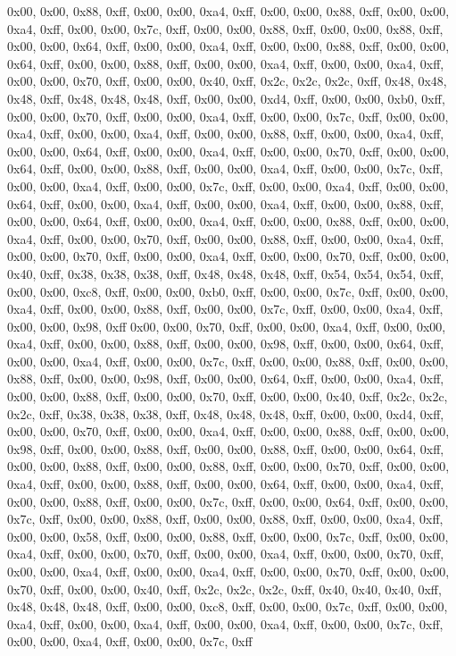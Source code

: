 0x00, 0x00, 0x88, 0xff, 0x00, 0x00, 0xa4, 0xff, 0x00, 0x00, 0x88, 0xff, 0x00, 0x00, 0xa4, 0xff, 0x00, 0x00, 0x7c, 0xff, 0x00, 0x00, 0x88, 0xff, 0x00, 0x00, 0x88, 0xff, 0x00, 0x00, 0x64, 0xff, 0x00, 0x00, 0xa4, 0xff, 0x00, 0x00, 0x88, 0xff, 0x00, 0x00, 0x64, 0xff, 0x00, 0x00, 0x88, 0xff, 0x00, 0x00, 0xa4, 0xff, 0x00, 0x00, 0xa4, 0xff, 0x00, 0x00, 0x70, 0xff, 0x00, 0x00, 0x40, 0xff, 0x2c, 0x2c, 0x2c, 0xff, 0x48, 0x48, 0x48, 0xff, 0x48, 0x48, 0x48, 0xff, 0x00, 0x00, 0xd4, 0xff, 0x00, 0x00, 0xb0, 0xff, 0x00, 0x00, 0x70, 0xff, 0x00, 0x00, 0xa4, 0xff, 0x00, 0x00, 0x7c, 0xff, 0x00, 0x00, 0xa4, 0xff, 0x00, 0x00, 0xa4, 0xff, 0x00, 0x00, 0x88, 0xff, 0x00, 0x00, 0xa4, 0xff, 0x00, 0x00, 0x64, 0xff, 0x00, 0x00, 0xa4, 0xff, 0x00, 0x00, 0x70, 0xff, 0x00, 0x00, 0x64, 0xff, 0x00, 0x00, 0x88, 0xff, 0x00, 0x00, 0xa4, 0xff, 0x00, 0x00, 0x7c, 0xff, 0x00, 0x00, 0xa4, 0xff, 0x00, 0x00, 0x7c, 0xff, 0x00, 0x00, 0xa4, 0xff, 0x00, 0x00, 0x64, 0xff, 0x00, 0x00, 0xa4, 0xff, 0x00, 0x00, 0xa4, 0xff, 0x00, 0x00, 0x88, 0xff, 0x00, 0x00, 0x64, 0xff, 0x00, 0x00, 0xa4, 0xff, 0x00, 0x00, 0x88, 0xff, 0x00, 0x00, 0xa4, 0xff, 0x00, 0x00, 0x70, 0xff, 0x00, 0x00, 0x88, 0xff, 0x00, 0x00, 0xa4, 0xff, 0x00, 0x00, 0x70, 0xff, 0x00, 0x00, 0xa4, 0xff, 0x00, 0x00, 0x70, 0xff, 0x00, 0x00, 0x40, 0xff, 0x38, 0x38, 0x38, 0xff, 0x48, 0x48, 0x48, 0xff, 0x54, 0x54, 0x54, 0xff, 0x00, 0x00, 0xc8, 0xff, 0x00, 0x00, 0xb0, 0xff, 0x00, 0x00, 0x7c, 0xff, 0x00, 0x00, 0xa4, 0xff, 0x00, 0x00, 0x88, 0xff, 0x00, 0x00, 0x7c, 0xff, 0x00, 0x00, 0xa4, 0xff, 0x00, 0x00, 0x98, 0xff
0x00, 0x00, 0x70, 0xff, 0x00, 0x00, 0xa4, 0xff, 0x00, 0x00, 0xa4, 0xff, 0x00, 0x00, 0x88, 0xff, 0x00, 0x00, 0x98, 0xff, 0x00, 0x00, 0x64, 0xff, 0x00, 0x00, 0xa4, 0xff, 0x00, 0x00, 0x7c, 0xff, 0x00, 0x00, 0x88, 0xff, 0x00, 0x00, 0x88, 0xff, 0x00, 0x00, 0x98, 0xff, 0x00, 0x00, 0x64, 0xff, 0x00, 0x00, 0xa4, 0xff, 0x00, 0x00, 0x88, 0xff, 0x00, 0x00, 0x70, 0xff, 0x00, 0x00, 0x40, 0xff, 0x2c, 0x2c, 0x2c, 0xff, 0x38, 0x38, 0x38, 0xff, 0x48, 0x48, 0x48, 0xff, 0x00, 0x00, 0xd4, 0xff, 0x00, 0x00, 0x70, 0xff, 0x00, 0x00, 0xa4, 0xff, 0x00, 0x00, 0x88, 0xff, 0x00, 0x00, 0x98, 0xff, 0x00, 0x00, 0x88, 0xff, 0x00, 0x00, 0x88, 0xff, 0x00, 0x00, 0x64, 0xff, 0x00, 0x00, 0x88, 0xff, 0x00, 0x00, 0x88, 0xff, 0x00, 0x00, 0x70, 0xff, 0x00, 0x00, 0xa4, 0xff, 0x00, 0x00, 0x88, 0xff, 0x00, 0x00, 0x64, 0xff, 0x00, 0x00, 0xa4, 0xff, 0x00, 0x00, 0x88, 0xff, 0x00, 0x00, 0x7c, 0xff, 0x00, 0x00, 0x64, 0xff, 0x00, 0x00, 0x7c, 0xff, 0x00, 0x00, 0x88, 0xff, 0x00, 0x00, 0x88, 0xff, 0x00, 0x00, 0xa4, 0xff, 0x00, 0x00, 0x58, 0xff, 0x00, 0x00, 0x88, 0xff, 0x00, 0x00, 0x7c, 0xff, 0x00, 0x00, 0xa4, 0xff, 0x00, 0x00, 0x70, 0xff, 0x00, 0x00, 0xa4, 0xff, 0x00, 0x00, 0x70, 0xff, 0x00, 0x00, 0xa4, 0xff, 0x00, 0x00, 0xa4, 0xff, 0x00, 0x00, 0x70, 0xff, 0x00, 0x00, 0x70, 0xff, 0x00, 0x00, 0x40, 0xff, 0x2c, 0x2c, 0x2c, 0xff, 0x40, 0x40, 0x40, 0xff, 0x48, 0x48, 0x48, 0xff, 0x00, 0x00, 0xc8, 0xff, 0x00, 0x00, 0x7c, 0xff, 0x00, 0x00, 0xa4, 0xff, 0x00, 0x00, 0xa4, 0xff, 0x00, 0x00, 0xa4, 0xff, 0x00, 0x00, 0x7c, 0xff, 0x00, 0x00, 0xa4, 0xff, 0x00, 0x00, 0x7c, 0xff
